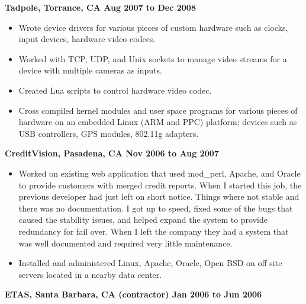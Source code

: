 \documentclass{res}
\begin{document}
\begin{resume}
\begin{itemize}
          \end{itemize}

          {\large \bf Tadpole, Torrance, CA \hfill Aug 2007 to Dec 2008}

          \begin{itemize}

          \item
	    Wrote device drivers for various pieces of custom hardware such
	    as clocks, input devices, hardware video codecs.

          \item
	    Worked with TCP, UDP, and Unix sockets to manage video streams
	    for a device with multiple cameras as inputs.

          \item
	    Created Lua scripts to control hardware video codec.

          \item
	    Cross compiled kernel modules and user space programs for various
	    pieces of hardware on an embedded Linux (ARM and PPC) platform;
	    devices such as USB controllers, GPS modules, 802.11g adapters.

          \end{itemize}

          {\large \bf CreditVision, Pasadena, CA \hfill Nov 2006 to Aug 2007}

          \begin{itemize}

          \item
	    Worked on existing web application that used mod\_perl, Apache,
	    and Oracle to provide customers with merged credit reports.
	    When I started this job, the previous developer had just
	    left on short notice.  Things where not stable and there was
	    no documentation.  I got up to speed, fixed some of the bugs
	    that caused the stability issues, and helped expand the system
	    to provide redundancy for fail over.  When I left the company
	    they had a system that was well documented and required very
	    little maintenance.

          \item
	    Installed and administered Linux, Apache, Oracle, Open BSD on
	    off site servers located in a nearby data center.
          \end{itemize}

          {\large \bf ETAS, Santa Barbara, CA (contractor) \hfill Jan 2006 to
            Jun 2006}


\end{resume}
\end{document}
